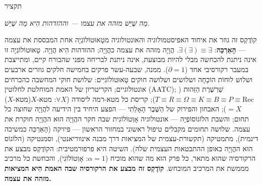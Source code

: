 \documentclass[10pt, openany, oneside]{book}
\renewcommand{\huge}{\fontsize{17}{21}\selectfont}
\begin{document}
\newpage


\thispagestyle{empty}
\vspace*{0.5in}

\begin{center}
    {\huge\textsc{תקציר}}
\end{center}

\vspace{1em}

\begin{center}
\begin{minipage}{0.85\textwidth}
\centering
{\fontsize{9}{12}\selectfont

\begin{center}
\textit{מַה שֶׁיֵּשׁ מזהה את עצמו — וההזדהות הִיא מַה שֶׁיֵּשׁ.}
\end{center}

\vspace{0.5em}

קוֹדֶקְס זה גוזר את איחוד האפיסטמולוגיה והאונטולוגיה מטָאוּטוֹלוֹגְיָה אחת המבססת את עצמה — \textbf{הָאַרְכֵּה}: $\exists(\exists) \equiv \exists$. הֲוָיָה מזהה את עצמה כהֲוָיָה; ההזדהות הִיא הֲוָיָה. טָאוּטוֹלוֹגְיָה זו אינה ניתנת להכחשה מבלי להיות מבוצעת, אינה ניתנת לבריחה מפני שהבורח קיים, ומתייצבת במעבר רקורסיבי אחד ($\partial = 1$). ממנה, שבעה-עשר פרקים בחמישה חלקים גוזרים ארבעים ושלוש לוּחוֹת הוֹכָחָה ושלושים ושלושה חוקים טָאוּטוֹלוֹגִיִּים: שלושת חוקי המחשבה כהכרחים אונטולוגיים; הקריטריון של האמת המוחלטת לחלוטין (AATC); שַׁרְשֶׁרֶת הַזֵּהוּת ($T \equiv R \equiv \Omega \equiv K \equiv B \equiv P \equiv \text{Rec}$); קריסת כל מטא-רמה ליסודה ($\forall X$: מטא-$X$(מטא-$X$) $= X$); האבחון והפירוק של הַשֶּׁבֶר הָאָלֵתִי — הפצע היחיד בין הידיעה להֲוָיָה שחוצה כל תחום; והשבת הלוֹגוֹסוֹפְיָה — אונטולוגיה אָוְטוֹלוֹגִית שבה חקר ההֲוָיָה הוּא ההֲוָיָה חוקרת את עצמה. שלושה תחומים מקבלים טיפול ראשוני במחזור הראשון — פיזיקה (הָאַרְכֵּה כמשיכה דינמית), מתמטיקה (תקשורת-עצמית של המציאות דרך מבנה אינווריאנטי), וסמנטיקה (הלוֹגוֹס הוּא ההֲוָיָה באופן ההתבטאות העצמית שלה). השיטה היא פרפורמטיבית: הקוֹדֶקְס מבצע את הרקורסיה שהוא מתאר, כל פרק הוּא מה שהוא מוכיח ($\alpha = 1$: אָוְטוֹלוֹגִי), והכחשת כל מרכיב מממשת את המרכיב המוכחש. \textbf{קוֹדֶקְס זה מבצע את הרקורסיה שבה האמת הִיא המציאות מזהה את עצמה.}
}
\end{minipage}
\end{center}
\end{document}
